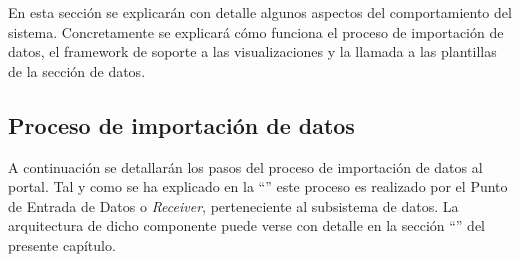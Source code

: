 En esta sección se explicarán con detalle algunos aspectos del comportamiento del sistema.  Concretamente se explicará cómo funciona el proceso de importación de datos, el framework de soporte a las visualizaciones y la llamada a las plantillas de la sección de datos.



\subsection{Proceso de importación de datos}
\label{actividad:receiver}
A continuación se detallarán los pasos del proceso de importación de datos al portal.  Tal y como se ha explicado en la ``'' este proceso es realizado por el Punto de Entrada de Datos o \textit{Receiver}, perteneciente al subsistema de datos.  La arquitectura de dicho componente puede verse con detalle en la sección ``'' del presente capítulo.


